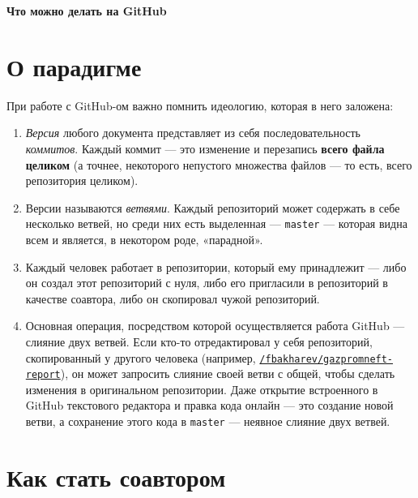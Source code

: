 \documentclass[12pt,a4paper,report]{ncc}
\begin{document}


$\phantom{.}$ \vspace{2cm}

{\bf\LARGE\noindent Что можно делать на GitHub}

\renewcommand{\thesection}{\arabic{section}}
\def\ni{\noindent}

\section{О парадигме}

\ni При работе с GitHub-ом важно помнить идеологию, которая в него заложена:

\begin{enumerate}

	\item {\it Версия} любого документа представляет из себя последовательность {\it коммитов}. Каждый коммит — это изменение и перезапись {\bf всего файла целиком} (а точнее, некоторого непустого множества файлов — то есть, всего репозитория целиком).

	\item Версии называются {\it ветвями}. Каждый репозиторий может содержать в себе несколько ветвей, но среди них есть выделенная — {\tt master} — которая видна всем и является, в некотором роде, «парадной».

	\item Каждый человек работает в репозитории, который ему принадлежит — либо он создал этот репозиторий с нуля, либо его пригласили в репозиторий в качестве соавтора, либо он скопировал чужой репозиторий.

	\item Основная операция, посредством которой осуществляется работа GitHub — слияние двух ветвей. Если кто-то отредактировал у себя репозиторий, скопированный у другого человека (например, {\tt \href{https://github.com/fbakharev/gazpromneft-report}{/fbakharev/gazpromneft-report}}), он может запросить слияние своей ветви с общей, чтобы сделать изменения в оригинальном репозитории. Даже открытие встроенного в GitHub текстового редактора и правка кода онлайн — это создание новой ветви, а сохранение этого кода в {\tt master} — неявное слияние двух ветвей.

\end{enumerate}


\section{Как стать соавтором}
\end{document}
